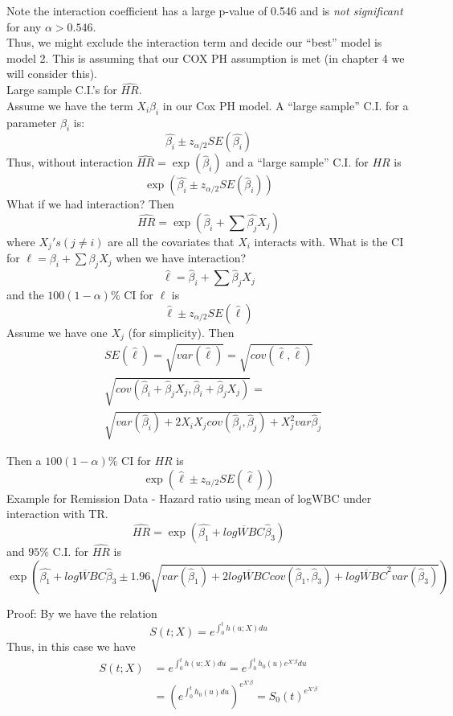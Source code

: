 \documentclass{article}
\begin{document}
Note the interaction coefficient has a large p-value of 0.546 and is \textit{not significant } for any $\alpha > 0.546$. \\
Thus, we might exclude the interaction term and decide our ``best'' model is model 2. This is assuming that our COX PH assumption is met (in chapter 4 we will consider this). \\

Large sample C.I.'s for $\hat{HR}$. \\

Assume we have the term $X_i\beta_i$ in our Cox PH model. A ``large sample'' C.I. for a parameter $\beta_i$ is:
\[
\hat{\beta_i} \pm z_{\alpha/2} SE(\hat{\beta_i})
\]
Thus, without interaction $\hat{HR} = \exp(\hat{\beta}_i)$ and a ``large sample'' C.I. for $HR$ is
\[
\exp(\hat{\beta_i} \pm z_{\alpha/2} SE(\hat{\beta}_i))
\]
What if we had interaction? Then
\[
\hat{HR} = \exp(\hat{\beta}_i + \sum \hat{\beta_j}X_j)
\]
where $X_j's (j \neq i)$ are all the covariates that $X_i$ interacts with. What is the CI for $\ell = \beta_i + \sum \beta_jX_j$ when we have interaction?
\[
\hat{\ell} = \hat{\beta}_i + \sum \hat{\beta}_jX_j
\]
and the $100(1-\alpha)\%$ CI for $\ell$ is
\[
\hat{\ell} \pm z_{\alpha/2} SE(\hat{\ell})
\]
Assume we have one $X_j$ (for simplicity).
Then
\begin{align*}
& SE(\hat{\ell}) = \sqrt{var(\hat{\ell})} = \sqrt{cov(\hat{\ell},\hat{\ell})} \\
&\sqrt{cov(\hat{\beta}_i+ \hat{\beta}_jX_j,\hat{\beta}_i+ \hat{\beta}_jX_j)} = \\
&\sqrt{var(\hat{\beta}_i) + 2X_iX_j cov(\hat{\beta}_i,\hat{\beta}_j) + X_j^2 var{\hat{\beta}_j}}
\end{align*}

Then a $100(1-\alpha)\%$ CI for $HR$ is
\[
\exp(\hat{\ell} \pm z_{\alpha/2} SE(\hat{\ell}))
\]
Example for Remission Data - Hazard ratio using mean of logWBC under interaction with TR.
\[
\hat{HR} = \exp(\hat{\beta_1}+\overline{logWBC}\hat{\beta}_3)
\]
and $95\%$ C.I. for $\hat{HR}$ is
\[
\exp\left(\hat{\beta_1}+\overline{logWBC}\hat{\beta}_3 \pm 1.96 \sqrt{var(\hat{\beta}_1)+2\overline{logWBC}cov(\hat{\beta}_1,\hat{\beta}_3)+\overline{logWBC}^2var(\hat{\beta}_3)}\right)
\]

Proof:
By  we have the relation
\[
S(t;X) = e^{\int_0^t h(u;X)du}
\]
Thus, in this case we have
\begin{align*}
S(t;X) & =  e^{\int_0^t h(u;X)du} = e^{\int_0^t h_0(u)e^{X'\beta}du} \\
& = (e^{\int_0^t h_0(u)du})^{e^{X'\beta}} = S_0(t)^{e^{X'\beta}}
\end{align*}
\end{document}
